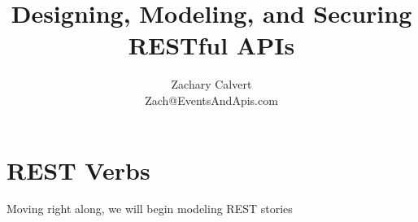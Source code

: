 \documentclass[12pt,oneside]{book} %
\title{Designing, Modeling, and Securing \\ RESTful APIs}
\author{Zachary Calvert \\Zach@EventsAndApis.com }
\begin{document}
\maketitle

\frontmatter
\tableofcontents
\clearpage

\clearpage



\clearpage
\mainmatter
{}





\chapter{REST Verbs}
Moving right along, we will begin modeling REST stories 



\end{document}
